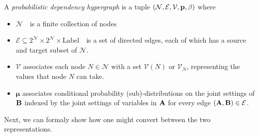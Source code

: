 \documentclass{article}
\theoremstyle{plain}
\theoremstyle{definition}
\theoremstyle{remark}
\newcommand{\note}[1]{{\color{blue}\ \!\Large\smash{\textbf{[}}{\normalsize\textsc{note:} #1}\ \!\smash{\textbf{]}}}}
\newcommand{\bmu}{\boldsymbol{\mu}}
\newcommand{\V}{\mathcal V}
\newcommand{\N}{\mathcal N}
\newcommand{\Ed}{\mathcal E}
\newcommand{\modelnamehyper}{probabilistic dependency hypergraph}
\newcommand{\MNH}{PDH}
\numberwithin{equation}{section}
\begin{document}
	\begin{defn}[\MNH]\label{def:hypermodel}
		A \emph{\modelnamehyper} is a tuple $\mnvars[]$ where
		\begin{itemize}[nosep]
			\item $\N$~~is a finite collection of nodes
			\item $\Ed \subseteq 2^{\N} \times 2^{\N} \times \mathrm{Label}$~~is a set of directed edges, each of which has a source and target subset of $\N$.
			\item $\V$ associates each node $N \in \mathcal N$ with a set $\V(N)$ or $\V_N$, representing the values that node $N$ can take.
			\item $\bmu$
			associates conditional probability (sub)-distributions on the joint settings of $\bf B$ indexed by the joint settings of variables in $\bf A$ for every edge $({\bf A,B}) \in \Ed$. %
		\end{itemize}
	\end{defn}
	
	Next, we can formaly show how one might convert between the two representations.
		
\end{document}
